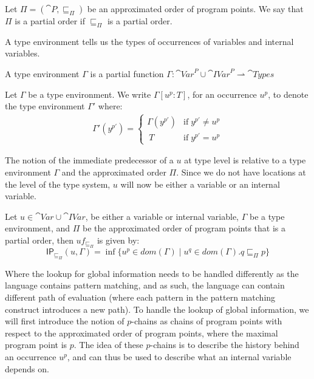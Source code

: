 \documentclass[acmsmall,sigplan]{acmart}
\newcommand{\uf}{\ensuremath{\mathsf{IP}}}
\begin{document}
\begin{definition}
	Let $\Pi=(\cat{P},\sqsubseteq_\Pi)$ be an approximated order of program points.
	We say that $\Pi$ is a partial order if $\sqsubseteq_\Pi$ is a partial order.
\end{definition}
\bigskip

A type environment tells us the types of occurrences of variables and
internal variables.

\begin{definition}
	A type environment $\Gamma$ is a partial function $\Gamma:\cat{Var}^P\cup\cat{IVar}^P\rightharpoonup\cat{Types}$
\end{definition}

\begin{definition}
	Let $\Gamma$ be a type environment.
	We write $\Gamma[u^p:T]$, for an occurrence $u^p$, to denote the type environment $\Gamma'$ where:
	\begin{align*}
		\Gamma'(y^{p'})=
		\left\{\begin{matrix}
			\Gamma(y^{p'}) & \mbox{if}\;y^{p'}\neq u^{p}\\\	 
			T & \mbox{if}\;y^{p'}=u^{p}
		\end{matrix}\right.
	\end{align*}
\end{definition}

The notion of the immediate predecessor of a $u$ at type level is
relative to a type environment $\Gamma$ and the approximated order
$\Pi$. Since we do not have locations at the level of the type system,
$u$ will now be either a variable or an internal variable.

\begin{definition}\label{def:GBindPi}
	Let $u\in \cat{Var}\cup\cat{IVar}$, be either a variable or
        internal variable, $\Gamma$ be a type environment, and $\Pi$
        be the approximated order of program points that is a partial
        order, then $uf_{\sqsubseteq_\Pi}$ is given by: 
	\[ \uf_{\sqsubseteq_\Pi}(u,\Gamma)=\inf\{u^p\in
          dom(\Gamma)\mid u^q\in dom(\Gamma).q\sqsubseteq_\Pi p\} \]
\end{definition}

Where the lookup for global information needs to be handled differently as the language contains pattern matching, and as such, the language can contain different path of evaluation (where each pattern in the pattern matching construct introduces a new path).
To handle the lookup of global information, we will first introduce the notion of $p$-chains as chains of program points with respect to the approximated order of program points, where the maximal program point is $p$.
The idea of these $p$-chains is to describe the history behind an occurrence $u^p$, and can thus be used to describe what an internal variable depends on.
\end{document}
